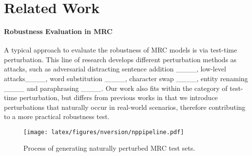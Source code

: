 \section{Related Work}
\label{sec:Related Work}

\paragraph{Robustness Evaluation in MRC} A typical approach to evaluate the robustness of MRC models is via test-time perturbation. This line of research develops different perturbation methods as attacks, such as
adversarial distracting sentence addition ____, low-level attacks____, word substitution ____, character swap ____, entity renaming ____ and paraphrasing ____. Our work also fits within the category of test-time perturbation, but differs from previous works in that we introduce perturbations that naturally occur in real-world scenarios, therefore contributing to a more practical robustness test. 


\begin{figure*}[t!]
    \centering
    \texttt{[image: latex/figures/nversion/nppipeline.pdf]}
    \caption{Process of generating naturally perturbed MRC test sets.}
    \label{fig:rm-updated}
\end{figure*}

